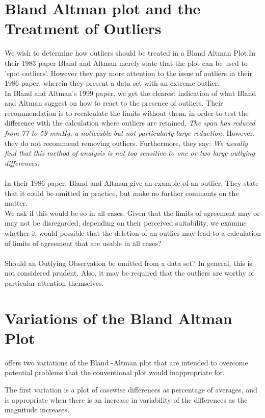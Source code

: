 \documentclass[12pt, a4paper]{report}
\begin{document}
\section{Bland Altman plot and the Treatment of Outliers}
We wish to determine how outliers should be treated in a Bland
Altman Plot.In their 1983 paper Bland and Altman  merely state
that the plot can be used to 'spot outliers'. However they pay
more attention to the issue of outliers in their $1986$ paper,
wherein they present a data set with an extreme outlier.
\\
In Bland and Altman's 1999 paper, we get the clearest indication
of what Bland and Altman suggest on how to react to the presence
of outliers. Their recommendation is to recalculate the limits
without them, in order to test the difference with the calculation
where outliers are retained. \emph{The span has reduced from 77 to
59 mmHg, a noticeable but not particularly large reduction.}
However, they do not recommend removing outliers. Furthermore,
they say: \emph{We usually find that this method of analysis is
not too sensitive to one or two large outlying differences.}
\\
\\
In  their $1986$ paper, Bland and Altman give an example of an
outlier. They state that it could be omitted in practice, but make
no further comments on the matter.
\\
We ask if this would be so in all cases. Given that the limits of
agreement may or may not be disregarded, depending on their
perceived suitability, we examine whether it would possible that
the deletion of an outlier may lead to a calculation of limits of
agreement that are usable in all cases?
\\
\\
Should an Outlying Observation be omitted from a data set? In
general, this is not considered prudent. Also, it may be required
that the outliers are worthy of particular attention themselves.
\section{Variations of the Bland Altman Plot}
\citet{BA99} offers two variations of the Bland -Altman plot that
are intended to overcome potential problems that the conventional
plot would inappropriate for.

The first variation is a plot of casewise differences as
percentage of averages, and is appropriate when there is an
increase in variability of the differences as the magnitude
increases.
\end{document}
